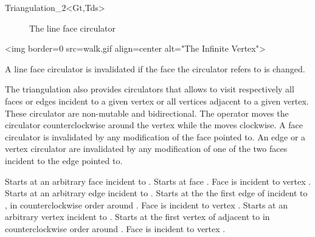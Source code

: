 \begin{ccClassTemplate}{Triangulation_2<Gt,Tds>}
\begin{ccTexOnly}
\begin{figure}
\begin{center}   \end{center}
\caption{The line face circulator}
\label{I1_fig_Line_face_circulator}
\end{figure}
\end{ccTexOnly} 

\begin{ccHtmlOnly}
<img border=0 src=walk.gif align=center alt="The Infinite Vertex">
\end{ccHtmlOnly} 

A line face circulator is invalidated if the face the circulator refers
to is changed.

\ccThreeToTwo




The triangulation also provides circulators that allows to visit 
respectively all faces or edges incident to a given vertex
or all vertices adjacent to a given vertex.
These circulator are
non-mutable
and bidirectional.
 The operator  moves the circulator
counterclockwise around the vertex while
the  moves clockwise.
A face circulator is invalidated by any modification of the face pointed to.
An edge or a vertex circulator are invalidated by any modification
of one of the two faces incident to the edge pointed to.

{Starts at an arbitrary face incident
to .}
\ccGlue
{}
{Starts at face .
\ccPrecond Face  is incident to vertex .}
\ccGlue
{}
{Starts at an arbitrary edge incident
to .}
\ccGlue
{}
{Starts at the the first edge of  incident to 
, in counterclockwise order around .
\ccPrecond Face  is incident to vertex .}
\ccGlue
{}
{Starts at an arbitrary  vertex incident
to .}
\ccGlue
{}
{Starts at the first vertex of  adjacent  to 
in  counterclockwise order around .
\ccPrecond Face  is incident to vertex .}





\end{ccClassTemplate}
